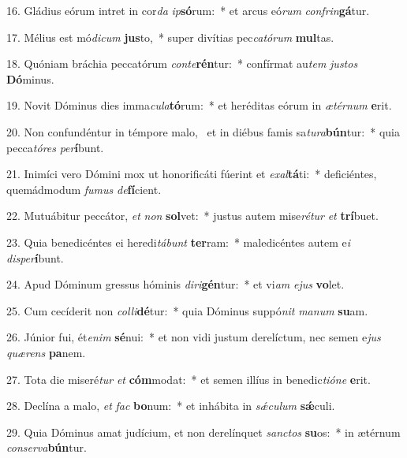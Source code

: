 16. Gládius eórum intret in cor\textit{da} \textit{ip}\textbf{só}rum:~*  et arcus eó\textit{rum} \textit{con}\textit{frin}\textbf{gá}tur.\

17. Mélius est mó\textit{di}\textit{cum} \textbf{jus}to,~*  super divítias pec\textit{ca}\textit{tó}\textit{rum} \textbf{mul}tas.\

18. Quóniam bráchia peccatórum \textit{con}\textit{te}\textbf{rén}tur:~*  confírmat au\textit{tem} \textit{jus}\textit{tos} \textbf{Dó}minus.\

19. Novit Dóminus dies imma\textit{cu}\textit{la}\textbf{tó}rum:~*  et heréditas eórum in \textit{æ}\textit{tér}\textit{num} \textbf{e}rit.\

20. Non confundéntur in témpore malo, \dag\  et in diébus famis sa\textit{tu}\textit{ra}\textbf{bún}tur:~*  quia pecca\textit{tó}\textit{res} \textit{per}\textbf{í}bunt.\

21. Inimíci vero Dómini mox ut honorificáti fúerint et \textit{ex}\textit{al}\textbf{tá}ti:~*  deficiéntes, quemádmodum \textit{fu}\textit{mus} \textit{de}\textbf{fí}cient.\

22. Mutuábitur peccátor, \textit{et} \textit{non} \textbf{sol}vet:~*  justus autem mise\textit{ré}\textit{tur} \textit{et} \textbf{trí}buet.\

23. Quia benedicéntes ei heredi\textit{tá}\textit{bunt} \textbf{ter}ram:~*  maledicéntes autem e\textit{i} \textit{dis}\textit{per}\textbf{í}bunt.\

24. Apud Dóminum gressus hóminis \textit{di}\textit{ri}\textbf{gén}tur:~*  et vi\textit{am} \textit{e}\textit{jus} \textbf{vo}let.\

25. Cum cecíderit non \textit{col}\textit{li}\textbf{dé}tur:~*  quia Dóminus suppó\textit{nit} \textit{ma}\textit{num} \textbf{su}am.\

26. Júnior fui, ét\textit{e}\textit{nim} \textbf{sé}nui:~*  et non vidi justum derelíctum, nec semen e\textit{jus} \textit{quæ}\textit{rens} \textbf{pa}nem.\

27. Tota die miseré\textit{tur} \textit{et} \textbf{cóm}modat:~*  et semen illíus in benedic\textit{ti}\textit{ó}\textit{ne} \textbf{e}rit.\

28. Declína a malo, \textit{et} \textit{fac} \textbf{bo}num:~*  et inhábita in \textit{sǽ}\textit{cu}\textit{lum} \textbf{sǽ}culi.\

29. Quia Dóminus amat judícium, et non derelínquet \textit{sanc}\textit{tos} \textbf{su}os:~*  in ætérnum \textit{con}\textit{ser}\textit{va}\textbf{bún}tur.\

